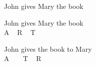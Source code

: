 \begin{exe}
 John gives Mary the book  
\end{exe}

\ea\label{ex:john2}
\gll John gives Mary the book \\
     A   ~      R     ~  T \\
\z

\begin{exe}
\gll John gives the book to  Mary \\
     A   ~       ~  T ~ R \\
\end{exe}


\ea 
  \z
\z
 
